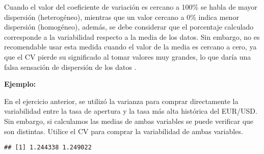 \documentclass[
]{book}
\newenvironment{Shaded}{\begin{snugshade}}{\end{snugshade}}
\newcommand{\CommentTok}[1]{\textcolor[rgb]{0.56,0.35,0.01}{\textit{#1}}}
\newcommand{\DecValTok}[1]{\textcolor[rgb]{0.00,0.00,0.81}{#1}}
\newcommand{\FunctionTok}[1]{\textcolor[rgb]{0.00,0.00,0.00}{#1}}
\newcommand{\NormalTok}[1]{#1}
\newcommand{\OtherTok}[1]{\textcolor[rgb]{0.56,0.35,0.01}{#1}}
\newcommand{\SpecialCharTok}[1]{\textcolor[rgb]{0.00,0.00,0.00}{#1}}
\begin{document}
Cuando el valor del coeficiente de variación es cercano a 100\% se habla de mayor dispersión (heterogéneo), mientras que un valor cercano a 0\% indica menor dispersión (homogéneo), además, se debe considerar que el porcentaje calculado corresponde a la variabilidad respecto a la media de los datos. Sin embargo, no es recomendable usar esta medida cuando el valor de la media es cercano a cero, ya que el CV pierde su significado al tomar valores muy grandes, lo que daría una falsa sensación de dispersión de los datos \citep[página 95]{anderson}.

\textbf{Ejemplo:}

En el ejercicio anterior, se utilizó la varianza para comprar directamente la variabilidad entre la tasa de apertura y la tasa más alta histórica del EUR/USD. Sin embargo, si calculamos las medias de ambas variables se puede verificar que son distintas. Utilice el CV para comprar la variabilidad de ambas variables.

\begin{Shaded}
\end{Shaded}

\begin{verbatim}
## [1] 1.244338 1.249022
\end{verbatim}

\begin{Shaded}
\end{Shaded}
\end{document}
